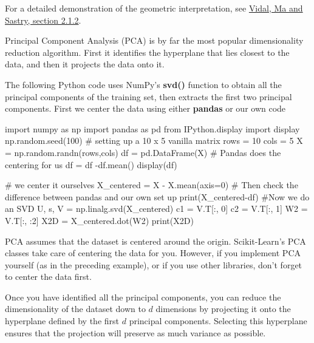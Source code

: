 \documentclass[%
oneside,                 %
final,                   %
10pt]{article}
\begin{document}
For a detailed demonstration of the geometric interpretation, see \href{{https://www.springer.com/gp/book/9780387878102}}{Vidal, Ma and Sastry, section 2.1.2}.

Principal Component Analysis (PCA) is by far the most popular dimensionality reduction algorithm.
First it identifies the hyperplane that lies closest to the data, and then it projects the data onto it.

The following Python code uses NumPy’s \textbf{svd()} function to obtain all the principal components of the
training set, then extracts the first two principal components. First we center the data using either \textbf{pandas} or our own code

























\bpycod
import numpy as np
import pandas as pd
from IPython.display import display
np.random.seed(100)
# setting up a 10 x 5 vanilla matrix 
rows = 10
cols = 5
X = np.random.randn(rows,cols)
df = pd.DataFrame(X)
# Pandas does the centering for us
df = df -df.mean()
display(df)

# we center it ourselves
X_centered = X - X.mean(axis=0)
# Then check the difference between pandas and our own set up
print(X_centered-df)
#Now we do an SVD
U, s, V = np.linalg.svd(X_centered)
c1 = V.T[:, 0]
c2 = V.T[:, 1]
W2 = V.T[:, :2]
X2D = X_centered.dot(W2)
print(X2D)

\epycod


PCA assumes that the dataset is centered around the origin. Scikit-Learn’s PCA classes take care of centering
the data for you. However, if you implement PCA yourself (as in the preceding example), or if you use other libraries, don’t
forget to center the data first.

Once you have identified all the principal components, you can reduce the dimensionality of the dataset
down to $d$ dimensions by projecting it onto the hyperplane defined by the first $d$ principal components.
Selecting this hyperplane ensures that the projection will preserve as much variance as possible. 
\end{document}
